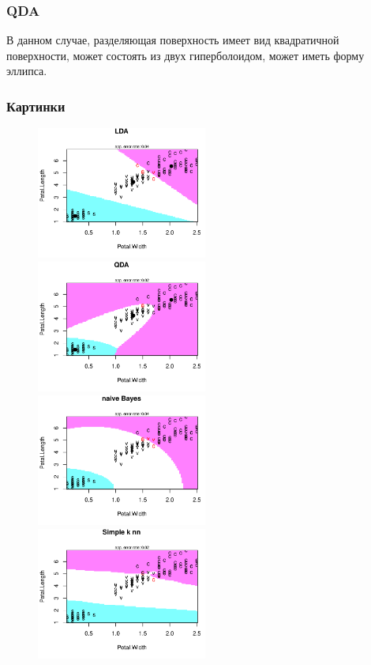 \subsubsection{QDA} %
	В данном случае, разделяющая поверхность имеет вид квадратичной поверхности, может состоять из двух гиперболоидом,
может иметь форму эллипса.

\subsubsection{Картинки}

	\begin{figure}[!h]
			\includegraphics[width=0.5\textwidth]{img/lda.pdf}
			\includegraphics[width=0.5\textwidth]{img/qda.pdf}\\
			\includegraphics[width=0.5\textwidth]{img/nbda.pdf}
			\includegraphics[width=0.5\textwidth]{img/sknn.pdf}
	\end{figure}

